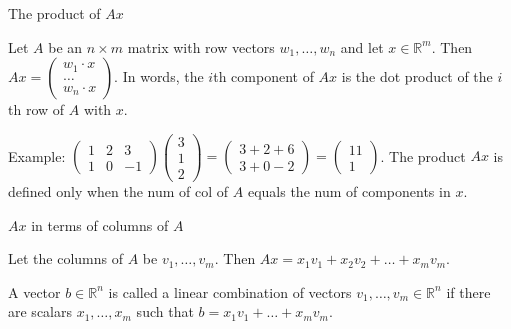 \begin{definition}{The product of \(Ax\)}

Let \(A\) be an \(n \times m\) matrix with row vectors \(w_{1},\ldots,w_{n}\) and let \(x \in \mathbb{R}^{m}\). Then \(Ax = \begin{pmatrix}
{w_{1} \cdot x} \\
\ldots \\
{w_{n} \cdot x}
\end{pmatrix}\). In words, the \(i\)th component of \(Ax\) is the dot product of the \(i\)th row of \(A\) with \(x\).

\end{definition}

Example: \(\begin{pmatrix}
1 & 2 & 3 \\
1 & 0 & {- 1}
\end{pmatrix}\begin{pmatrix}
3 \\
1 \\
2
\end{pmatrix} = \begin{pmatrix}
{3 + 2 + 6} \\
{3 + 0 - 2}
\end{pmatrix} = \begin{pmatrix}
11 \\
1
\end{pmatrix}\). The product \(Ax\) is defined only when the num of col of \(A\) equals the num of components in \(x\).

\begin{theorem}{\(Ax\) in terms of columns of \(A\)}

Let the columns of \(A\) be \(v_{1},\ldots,v_{m}\). Then \(Ax = x_{1}v_{1} + x_{2}v_{2} + \ldots + x_{m}v_{m}\).

\end{theorem}

\begin{definition}{}

A vector \(b \in \mathbb{R}^{n}\) is called a linear combination of vectors \(v_{1},\ldots,v_{m} \in \mathbb{R}^{n}\) if there are scalars \(x_{1},\ldots,x_{m}\) such that \(b = x_{1}v_{1} + \ldots + x_{m}v_{m}\).

\end{definition}


